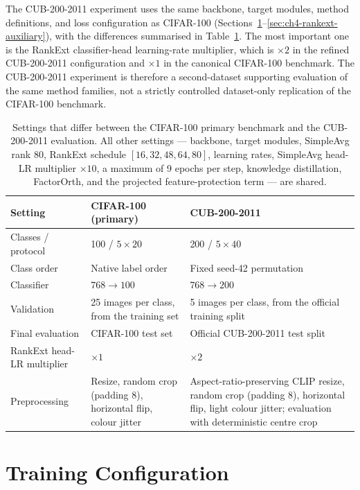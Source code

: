 The CUB-200-2011 experiment uses the same backbone, target modules, method
definitions, and loss configuration as CIFAR-100
(Sections~\ref{sec:ch4-training}--\ref{sec:ch4-rankext-auxiliary}), with
the differences summarised in Table~\ref{tab:ch4-cub-config}. The most
important one is the RankExt classifier-head learning-rate multiplier,
which is $\times2$ in the refined CUB-200-2011 configuration and $\times1$
in the canonical CIFAR-100 benchmark. The CUB-200-2011 experiment is
therefore a second-dataset supporting evaluation of the same method
families, not a strictly controlled dataset-only replication of the
CIFAR-100 benchmark.

\begin{table}[htbp]
\centering
\begin{tabularx}{\textwidth}{@{}l X X@{}}
\toprule
\textbf{Setting} & \textbf{CIFAR-100 (primary)} & \textbf{CUB-200-2011} \\
\midrule
Classes / protocol & 100 / $5\times20$ & 200 / $5\times40$ \\
Class order & Native label order & Fixed seed-42 permutation \\
Classifier & $768\to100$ & $768\to200$ \\
Validation & 25 images per class, from the training set & 5 images per class, from the official training split \\
Final evaluation & CIFAR-100 test set & Official CUB-200-2011 test split \\
RankExt head-LR multiplier & $\times1$ & $\times2$ \\
Preprocessing & Resize, random crop (padding 8), horizontal flip, colour jitter & Aspect-ratio-preserving CLIP resize, random crop (padding 8), horizontal flip, light colour jitter; evaluation with deterministic centre crop \\
\bottomrule
\end{tabularx}
\caption[CIFAR-100 and CUB-200-2011 configuration differences]{Settings that
differ between the CIFAR-100 primary benchmark and the CUB-200-2011
evaluation. All other settings --- backbone, target modules, SimpleAvg rank
80, RankExt schedule $[16,32,48,64,80]$, learning rates, SimpleAvg head-LR
multiplier $\times10$, a maximum of 9 epochs per step, knowledge
distillation, FactorOrth, and the projected feature-protection term --- are
shared.}
\label{tab:ch4-cub-config}
\end{table}

\section{Training Configuration}
\label{sec:ch4-training}


